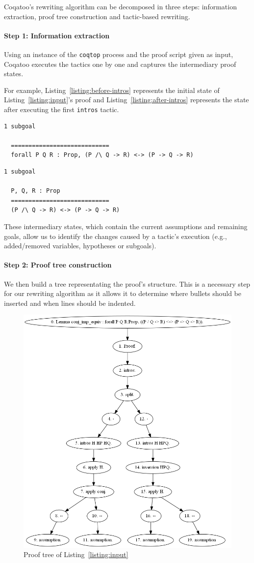 \documentclass[sigplan,screen,9pt]{acmart}
\begin{document}
Coqatoo's rewriting algorithm can be decomposed in three steps: information extraction, proof tree construction and tactic-based rewriting. 

\paragraph{Step 1: Information extraction}
Using an instance of the \texttt{coqtop} process and the proof script given as input, Coqatoo executes the tactics one by one and captures the intermediary proof states. 

For example, Listing~\ref{listing:before-intros} represents the initial state of Listing~\ref{listing:input}'s proof and Listing~\ref{listing:after-intros} represents the state after executing the first \lstinline{intros} tactic.
\begin{lstlisting}[label=listing:before-intros, captionpos=b,caption={State before executing the first intros tactic}]
  1 subgoal
  
  ============================
  forall P Q R : Prop, (P /\ Q -> R) <-> (P -> Q -> R)
\end{lstlisting}
\begin{lstlisting}[label=listing:after-intros,captionpos=b,caption={State after executing the first intros tactic}]
  1 subgoal
  
  P, Q, R : Prop
  ============================
  (P /\ Q -> R) <-> (P -> Q -> R)
\end{lstlisting}
These intermediary states, which contain the current assumptions and remaining goals, allow us to identify the changes caused by a tactic's execution (e.g., added/removed variables, hypotheses or subgoals).

\paragraph{Step 2: Proof tree construction}
We then build a tree representating the proof's structure. This is a necessary step for our rewriting algorithm as it allows it to determine where bullets should be inserted and when lines should be indented.

\begin{figure}[ht]
  \includegraphics[width=0.5\columnwidth]{images/proof-tree.png}
  \caption{Proof tree of Listing~\ref{listing:input}}
\end{figure}
  
\end{document}
